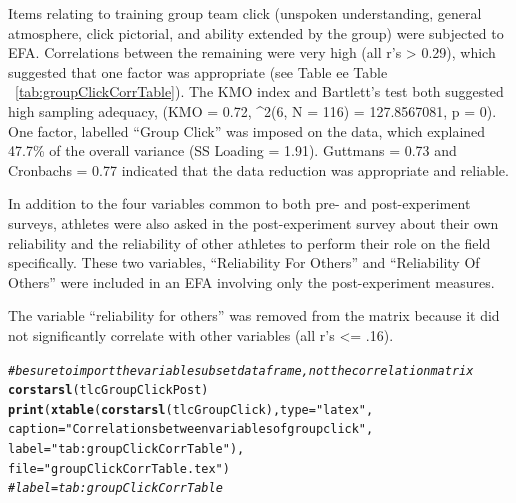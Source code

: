 \documentclass[english]{article}\usepackage[]{graphicx}\usepackage[]{color}
\makeatletter
\newcommand{\hlstr}[1]{\textcolor[rgb]{0.192,0.494,0.8}{#1}}%
\newcommand{\hlcom}[1]{\textcolor[rgb]{0.678,0.584,0.686}{\textit{#1}}}%
\newcommand{\hlstd}[1]{\textcolor[rgb]{0.345,0.345,0.345}{#1}}%
\newcommand{\hlkwc}[1]{\textcolor[rgb]{0.333,0.667,0.333}{#1}}%
\newcommand{\hlkwd}[1]{\textcolor[rgb]{0.737,0.353,0.396}{\textbf{#1}}}%
\newenvironment{kframe}{%
 \def\at@end@of@kframe{}%
 \ifinner\ifhmode%
  \def\at@end@of@kframe{\end{minipage}}%
  \begin{minipage}{\columnwidth}%
 \fi\fi%
 \def\FrameCommand##1{\hskip\@totalleftmargin \hskip-\fboxsep
 \colorbox{shadecolor}{##1}\hskip-\fboxsep
     \hskip-\linewidth \hskip-\@totalleftmargin \hskip\columnwidth}%
 \MakeFramed {\advance\hsize-\width
   \@totalleftmargin\z@ \linewidth\hsize
   \@setminipage}}%
 {\par\unskip\endMakeFramed%
 \at@end@of@kframe}
\newenvironment{knitrout}{}{} %
\makeatother
\begin{document}
Items relating to training group team click (unspoken understanding, general atmosphere, click pictorial, and ability extended by the group) were subjected to EFA.    Correlations between the remaining were very high (all r's > 0.29), which suggested that one factor was appropriate (see Table ee Table ~\ref{tab:groupClickCorrTable}). The KMO index and Bartlett's test both suggested high sampling adequacy, (KMO =  0.72, \chi^2(6, N = 116) = 127.8567081, p = 0).  
One factor, labelled ``Group Click'' was imposed on the data, which explained 47.7\% of the overall variance (SS Loading = 1.91). Guttmans \lambda = 0.73 and Cronbachs \alpha = 0.77 indicated that the data reduction was appropriate and reliable.


In addition to the four variables common to both pre- and post-experiment surveys, athletes were also asked in the post-experiment survey about their own reliability and the reliability of other athletes to perform their role on the field specifically. These two variables, ``Reliability For Others'' and ``Reliability Of Others'' were included in an EFA involving only the post-experiment measures.

The variable ``reliability for others'' was removed from the matrix because it did not significantly correlate with other variables (all r's <= .16).




\begin{knitrout}
\color{fgcolor}\begin{kframe}
\begin{alltt}
\hlcom{# be sure to import the variable subset data frame, not the correlation matrix}
\hlkwd{corstarsl}\hlstd{(tlcGroupClickPost)}
\hlkwd{print}\hlstd{(}\hlkwd{xtable}\hlstd{(}\hlkwd{corstarsl}\hlstd{(tlcGroupClick),} \hlkwc{type}\hlstd{=} \hlstr{"latex"}\hlstd{,}
                    \hlkwc{caption} \hlstd{=} \hlstr{"Correlations between variables of group click"}\hlstd{,}
                    \hlkwc{label} \hlstd{=} \hlstr{"tab:groupClickCorrTable"}\hlstd{),}
                    \hlkwc{file} \hlstd{=} \hlstr{"groupClickCorrTable.tex"}\hlstd{)}
\hlcom{# label = tab:groupClickCorrTable}
\end{alltt}
\end{kframe}
\end{knitrout}
\end{document}
